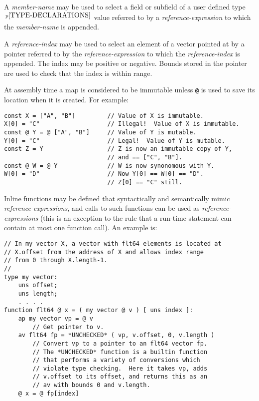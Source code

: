 \documentclass[12pt]{article}
\newcommand{\TT}[1]{{\tt \bfseries #1}}
\newcommand{\pagnote}[1]{$\,^{p\pageref{#1}}$}
\newcommand{\EOL}{\penalty \exhyphenpenalty}
\newenvironment{indpar}[1][0.3in]%
	{\begin{list}{}%
		     {\setlength{\itemsep}{0in}%
		      \setlength{\topsep}{0in}%
		      \setlength{\parsep}{1ex}%
		      \setlength{\labelwidth}{#1}%
		      \setlength{\leftmargin}{#1}%
		      \addtolength{\leftmargin}{\labelsep}}%
	 \item}%
	{\end{list}}
\begin{document}
A {\em member-name} may be used to select a field or subfield
of a user defined type\pagnote{TYPE-DECLARATIONS} value referred
to by a {\em reference-expression}
to which the {\em member-name} is appended.

A {\em reference-index} may be used to select an element of a vector
pointed at by a pointer referred to by the
{\em reference-expression}
to which the {\em reference-index} is appended.  The index may be
positive or negative.  Bounds stored in the pointer are used to
check that the index is within range.

At assembly time a map is considered to be immutable unless
\TT{@} is used to save its location when it is created.  For example:
\begin{indpar}\begin{verbatim}
const X = ["A", "B"]         // Value of X is immutable.
X[0] = "C"                   // Illegal!  Value of X is immutable.
const @ Y = @ ["A", "B"]     // Value of Y is mutable.
Y[0] = "C"                   // Legal!  Value of Y is mutable.
const Z = Y                  // Z is now an immutable copy of Y,
                             // and == ["C", "B"].
const @ W = @ Y              // W is now synonomous with Y.
W[0] = "D"                   // Now Y[0] == W[0] == "D".
                             // Z[0] == "C" still.
\end{verbatim}\end{indpar}


Inline functions may be defined that syntactically and semantically mimic
{\em reference-\EOL expres\-sions}, and calls to such functions
can be used as {\em reference-expressions} (this is an exception
to the rule that a run-time statement can contain at most one function
call).  An example is:
\label{REFERENCE-EXPRESSION-FUNCTION-EXAMPLE}

\begin{indpar}\begin{verbatim}
// In my vector X, a vector with flt64 elements is located at
// X.offset from the address of X and allows index range
// from 0 through X.length-1.
//
type my vector:
    uns offset;
    uns length;
    . . . .
function flt64 @ x = ( my vector @ v ) [ uns index ]:
    ap my vector vp = @ v
        // Get pointer to v.
    av flt64 fp = *UNCHECKED* ( vp, v.offset, 0, v.length )
        // Convert vp to a pointer to an flt64 vector fp.
        // The *UNCHECKED* function is a builtin function
        // that performs a variety of conversions which
        // violate type checking.  Here it takes vp, adds
        // v.offset to its offset, and returns this as an
        // av with bounds 0 and v.length.
    @ x = @ fp[index]
\end{verbatim}\end{indpar}
\end{document}
